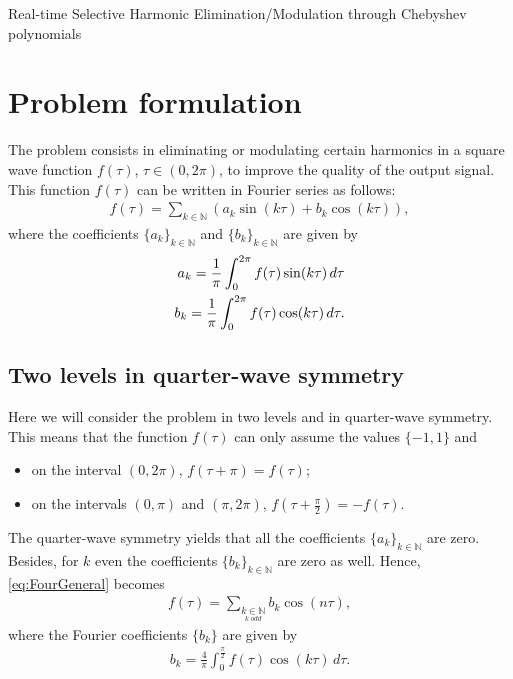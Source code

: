 \documentclass[a4paper]{article}
\numberwithin{equation}{section}
\begin{document}
\begin{center}
\Large{Real-time Selective Harmonic Elimination/Modulation through Chebyshev polynomials} 
\end{center}

\section{Problem formulation}

The problem consists in eliminating or modulating certain harmonics in a square wave function $f(\tau)$, $\tau\in (0,2\pi)$, to improve the quality of the output signal. This function $f(\tau)$ can be written in Fourier series as follows:
\begin{align}\label{eq:FourGeneral}
	f(\tau) = \sum_{k\in\mathbb{N}} \left(a_k\sin(k\tau)+b_k\cos(k\tau)\right),
\end{align}
where the coefficients $\{a_k\}_{k\in\mathbb{N}}$ and $\{b_k\}_{k\in\mathbb{N}}$ are given by
\begin{align}\label{eq:FourCoeffFull}
	a_k = \frac 1\pi \int_0^{2\pi} f(\tau)\sin(k\tau)\,d\tau\notag
	\\
	b_k = \frac 1\pi \int_0^{2\pi} f(\tau)\cos(k\tau)\,d\tau.
\end{align}

\subsection{Two levels in quarter-wave symmetry}

Here we will consider the problem in two levels and in quarter-wave symmetry. This means that the function $f(\tau)$ can only assume the values $\{-1,1\}$ and  
\begin{itemize}
	\item on the interval $(0,2\pi)$, $f(\tau+\pi) = f(\tau)$;
	\item on the intervals $(0,\pi)$ and $(\pi,2\pi)$, $f(\tau+\frac \pi2) = -f(\tau)$.
\end{itemize}

The quarter-wave symmetry yields that all the coefficients $\{a_k\}_{k\in\mathbb{N}}$ are zero. Besides, for $k$ even the coefficients $\{b_k\}_{k\in\mathbb{N}}$ are zero as well. Hence, \eqref{eq:FourGeneral} becomes
\begin{align}\label{eq:FourQuarter}
	f(\tau) = \sum_{\underset{k\;odd}{k\in\mathbb{N}}} b_k\cos(n\tau),
\end{align}
where the Fourier coefficients $\{b_k\}$ are given by
\begin{align}\label{eq:FourCoeffInt}
	b_k = \frac 4\pi \int_0^{\frac \pi2} f(\tau)\cos(k\tau)\,d\tau.
\end{align}
\end{document}
